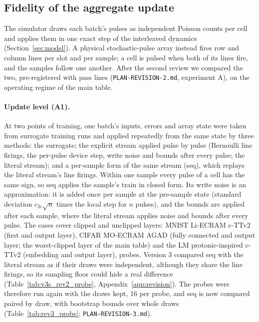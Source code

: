 \subsection{Fidelity of the aggregate update}\label{sec:fidelity}
The simulator draws each batch's pulses as independent Poisson counts per cell and applies them in one exact step of the
interleaved dynamics (Section~\ref{sec:model}). A physical stochastic-pulse array instead fires row and column lines per slot
and per sample; a cell is pulsed when both of its lines fire, and the samples follow one another. After the second review we
compared the two, pre-registered with pass lines (\texttt{PLAN-REVISION-2.md}, experiment A), on the operating regime of the
main table.

\paragraph{Update level (A1).} At two points of training, one batch's inputs, errors and array state were taken from surrogate
training runs and applied repeatedly from the same state by three methods: the surrogate; the explicit stream applied pulse by
pulse (Bernoulli line firings, the per-pulse device step, write noise and bounds after every pulse; the literal stream); and a
per-sample form of the same stream (seq), which replays the literal stream's line firings. Within one sample every pulse of a
cell has the same sign, so seq applies the sample's train in closed form. Its write noise is an approximation: it is added once
per sample at the pre-sample state (standard deviation $c_{2c}\sqrt{n}$ times the local step for $n$ pulses), and the bounds are
applied after each sample, where the literal stream applies noise and bounds after every pulse. The cases cover clipped and
unclipped layers: MNIST Li-ECRAM c-TTv2 (first and output layer), CIFAR MO-ECRAM AGAD (fully connected and output layer; the
worst-clipped layer of the main table) and the LM protonic-inspired c-TTv2 (embedding and output layer), \RYProbeN{} probes.
Version 3 compared seq with the literal stream as if their draws were independent, although they share the line firings, so
its sampling floor could hide a real difference (Table~\ref{tab:v3s_rev2_probe}, Appendix~\ref{app:revision}). The probes were
therefore run again with the draws kept, 16 per probe, and seq is now compared paired by draw, with bootstrap bounds over whole
draws (Table~\ref{tab:rev3_probe}; \texttt{PLAN-REVISION-3.md}).
